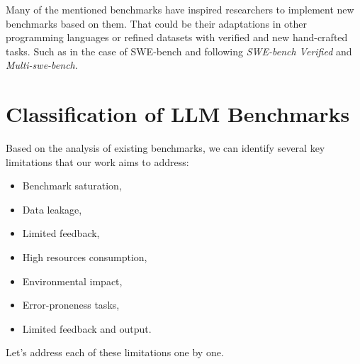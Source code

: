 Many of the mentioned benchmarks have inspired researchers to implement new benchmarks based on them.
That could be their adaptations in other programming languages or refined datasets with verified and new hand-crafted tasks.
Such as in the case of SWE-bench and following \textit{SWE-bench Verified} and \textit{Multi-swe-bench}.


\section{Classification of LLM Benchmarks}



Based on the analysis of existing benchmarks, we can identify several key limitations that our work aims to address:
\begin{itemize}
    \item Benchmark saturation,
    \item Data leakage,
    \item Limited feedback,
    \item High resources consumption,
    \item Environmental impact,
    \item Error-proneness tasks,
    \item Limited feedback and output.
\end{itemize}

Let's address each of these limitations one by one.

